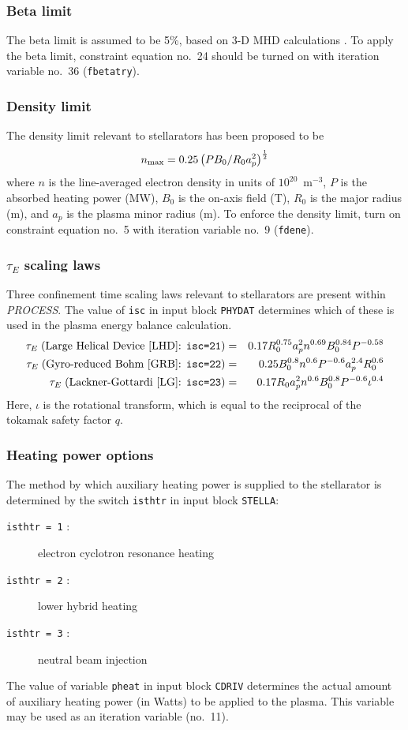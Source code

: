 \documentclass[11pt,a4paper]{report}
\makeatletter
\newcommand{\PSD}{\mbox{\it PROCESS}\@.\/ }
\makeatother
\begin{document}
\subsubsection{Beta limit}
The beta limit is assumed to be 5\%, based on 3-D MHD calculations
\cite{Nuhrenberg}. To apply the beta limit, constraint equation no.\ 24 should
be turned on with iteration variable no.\ 36 ({\tt fbetatry}).

\subsubsection{Density limit}
The density limit relevant to stellarators has been proposed to be~\cite{LHD}
\begin{equation}
n_{\mbox{\scriptsize max}} = 0.25\left( P B_0 / R_0 a_p^2\right)^\frac{1}{2}
\end{equation}
where $n$ is the line-averaged electron density in units of
$10^{20}$~m$^{-3}$, $P$ is the absorbed heating power (MW), $B_0$ is the
on-axis field (T), $R_0$ is the major radius (m), and $a_p$ is the plasma
minor radius (m). To enforce the density limit, turn on constraint equation
no.\ 5 with iteration variable no.\ 9 ({\tt fdene}).

\subsubsection{$\tau_E$ scaling laws}
Three confinement time scaling laws relevant to stellarators are present
within \PSD The value of {\tt isc} in input block {\tt PHYDAT} determines
which of these is used in the plasma energy balance calculation.
\begin{eqnarray}
\tau_E\; (\mbox{Large Helical Device~\cite{LHD}: {\tt isc=21}})
& = & 0.17 R_0^{0.75} a_p^2 n^{0.69} B_0^{0.84} P^{-0.58} \\
\tau_E\; (\mbox{Gyro-reduced Bohm~\cite{GRB}: {\tt isc=22}})
 & = & 0.25 B_0^{0.8} n^{0.6} P^{-0.6} a_p^{2.4} R_0^{0.6} \\
\tau_E\; (\mbox{Lackner-Gottardi~\cite{LG}: {\tt isc=23}})
& = & 0.17 R_0 a_p^2 n^{0.6} B_0^{0.8} P^{-0.6} \iota^{0.4}
\end{eqnarray}
Here, $\iota$ is the rotational transform, which is equal to the reciprocal
of the tokamak safety factor $q$.

\subsubsection{Heating power options}
The method by which auxiliary heating power is supplied to the stellarator is
determined by the switch {\tt isthtr} in input block {\tt STELLA}:
\begin{description}
\item [{\tt isthtr = 1} :] electron cyclotron resonance heating
\item [{\tt isthtr = 2} :] lower hybrid heating
\item [{\tt isthtr = 3} :] neutral beam injection
\end{description}
The value of variable {\tt pheat} in input block {\tt CDRIV} determines the
actual amount of auxiliary heating power (in Watts) to be applied to the
plasma. This variable may be used as an iteration variable (no.\ 11).
\end{document}
